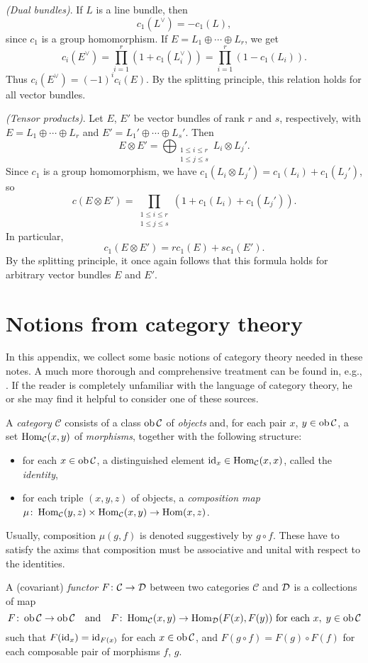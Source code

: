 \documentclass[a4paper,openany]{scrbook}
\renewcommand{\C}{\mathcal C}
\begin{document}
\begin{example}
\textit{(Dual bundles)}. If $L$ is a line bundle, then $$c_1(L^\vee)=-c_1(L),$$
since $c_1$ is a group homomorphism. If $E=L_1\oplus\cdots \oplus L_r$, we get
$$c_i(E^\vee)=\prod_{i=1}^r(1+c_1(L_i^\vee))=\prod_{i=1}^r(1-c_1(L_i)).$$
Thus $c_i(E^\vee)=(-1)^ic_i(E)$. By the splitting principle, this relation holds for all vector bundles.
\end{example}

\begin{example}
\textit{(Tensor products)}. Let $E$, $E'$ be vector bundles of rank $r$ and $s$, respectively, with $E=L_1\oplus\cdots\oplus L_r$ and $E'=L_1'\oplus\cdots\oplus L_s'$. Then
$$E\otimes E'=\bigoplus_{\substack{1\le i\le r\\1\le j\le s}}L_i\otimes L_j'.$$
Since $c_1$ is a group homomorphism, we have $c_1(L_i\otimes L_j')=c_1(L_i)+c_1(L_j')$, so
$$c(E\otimes E')=\prod_{\substack{1\le i\le r\\1\le j\le s}} (1+c_1(L_i)+c_1(L_j')).$$
In particular,
$$c_1(E\otimes E')=rc_1(E)+sc_1(E').$$
By the splitting principle, it once again follows that this formula holds for arbitrary vector bundles $E$ and $E'$.
\end{example}


\appendix

\chapter{Notions from category theory}

In this appendix, we collect some basic notions of category theory needed in these notes. A much more thorough and comprehensive treatment can be found in, e.g., \cite{maclane:cwm,borceux:volone}. If the reader is completely unfamiliar with the language of category theory, he or she may find it helpful to consider one of these sources.

\begin{defn}
A \emph{category} $\C$ consists of a class $\ob \C$ of \emph{objects} and, for each pair $x$, $y \in \ob \C$, a set $\Hom_\C(x,y)$ of \emph{morphisms}, together with the following structure:
\begin{itemize}
\item for each $x \in \ob \C$, a distinguished element $\id_x \in \Hom_\C(x,x)$, called the \emph{identity},
\item for each triple $(x,y,z)$ of objects, a \emph{composition map} $\mu\colon \Hom_\C(y,z) \times \Hom_\C(x,y) \to \Hom(x,z)$.
\end{itemize}
Usually, composition $\mu(g,f)$ is denoted suggestively by $g \circ f$.
These have to satisfy the axims that composition must be associative and unital with respect to the identities.

A (covariant) \emph{functor} $F\colon \C \to \D$ between two categories $\C$ and $\mathcal D$ is a collections of map
\[
F\colon \ob \C \to \ob \C \quad \text{and} \quad F\colon \Hom_\C(x,y) \to \Hom_\D(F(x),F(y)) \text{ for each } x,\;y \in \ob \C
\]
such that $F(\operatorname{id}_x) = \operatorname{id}_{F(x)}$ for each $x \in \ob \C$, and $F(g \circ f) = F(g) \circ F(f)$ for each composable pair of morphisms $f$, $g$.
\end{defn}
\end{document}

